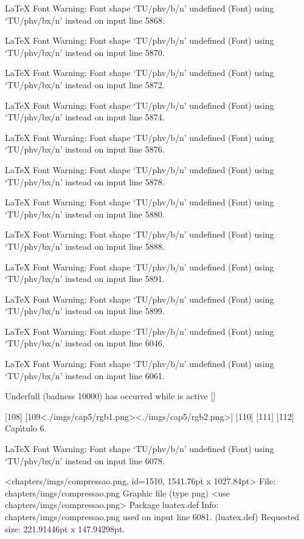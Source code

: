 LaTeX Font Warning: Font shape `TU/phv/b/n' undefined
(Font)              using `TU/phv/bx/n' instead on input line 5868.


LaTeX Font Warning: Font shape `TU/phv/b/n' undefined
(Font)              using `TU/phv/bx/n' instead on input line 5870.


LaTeX Font Warning: Font shape `TU/phv/b/n' undefined
(Font)              using `TU/phv/bx/n' instead on input line 5872.


LaTeX Font Warning: Font shape `TU/phv/b/n' undefined
(Font)              using `TU/phv/bx/n' instead on input line 5874.


LaTeX Font Warning: Font shape `TU/phv/b/n' undefined
(Font)              using `TU/phv/bx/n' instead on input line 5876.


LaTeX Font Warning: Font shape `TU/phv/b/n' undefined
(Font)              using `TU/phv/bx/n' instead on input line 5878.


LaTeX Font Warning: Font shape `TU/phv/b/n' undefined
(Font)              using `TU/phv/bx/n' instead on input line 5880.


LaTeX Font Warning: Font shape `TU/phv/b/n' undefined
(Font)              using `TU/phv/bx/n' instead on input line 5888.


LaTeX Font Warning: Font shape `TU/phv/b/n' undefined
(Font)              using `TU/phv/bx/n' instead on input line 5891.


LaTeX Font Warning: Font shape `TU/phv/b/n' undefined
(Font)              using `TU/phv/bx/n' instead on input line 5899.


LaTeX Font Warning: Font shape `TU/phv/b/n' undefined
(Font)              using `TU/phv/bx/n' instead on input line 6046.


LaTeX Font Warning: Font shape `TU/phv/b/n' undefined
(Font)              using `TU/phv/bx/n' instead on input line 6061.


Underfull \vbox (badness 10000) has occurred while \output is active []

[108] [109<./imgs/cap5/rgb1.png><./imgs/cap5/rgb2.png>] [110] [111] [112]
Cap\'{\i }tulo 6.

LaTeX Font Warning: Font shape `TU/phv/b/n' undefined
(Font)              using `TU/phv/bx/n' instead on input line 6078.

<chapters/imgs/compressao.png, id=1510, 1541.76pt x 1027.84pt>
File: chapters/imgs/compressao.png Graphic file (type png)
<use chapters/imgs/compressao.png>
Package luatex.def Info: chapters/imgs/compressao.png  used on input line 6081.
(luatex.def)             Requested size: 221.91446pt x 147.94298pt.

